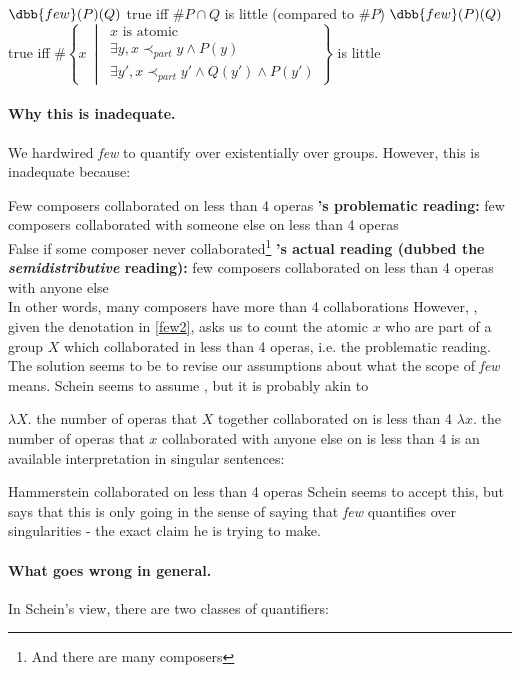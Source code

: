 \documentclass[english]{article}
\begin{document}
\pex
\a $\dbb{few}(P)(Q)$ true iff $\#P\cap Q$ is little (compared to $\#P$)
\a $\dbb{few}(P)(Q)$ true iff $\#\left\lbrace x\ \middle|\ 
\begin{array}{l}
x\text{ is atomic}\\
\exists y, x\prec_{part} y \wedge P(y)\\
\exists y', x\prec_{part} y' \wedge Q(y') \wedge P(y')
\end{array}
\right\rbrace$ is little \label{few2}
\xe
%

\paragraph{Why this is inadequate.} We hardwired \emph{few} to quantify over existentially over groups. However, this is inadequate because:

\pex
\a Few composers collaborated on less than 4 operas
\a \textbf{'s problematic reading:} few  composers collaborated with someone else on less than 4 operas\\
False if some composer never collaborated\footnote{And there are many composers}
\a \textbf{\cnextx{a}'s actual reading (dubbed the \emph{semidistributive} reading):} few composers collaborated on less than 4 operas with anyone else\\ 
In other words, many composers have more than 4 collaborations
\xe
%
However, , given the denotation in \cref{few2}, asks us to count the atomic $x$ who are part of a group $X$ which collaborated in less than 4 operas, i.e. the problematic reading. The solution seems to be to revise our assumptions about what the scope of \emph{few} means. Schein seems to assume , but it is probably akin to 

\pex
\a $\lambda X.$ the number of operas that $X$ together collaborated on is less than 4
\a $\lambda x.$ the number of operas that $x$ collaborated with anyone else on is less than 4
\xe
%
 is an available interpretation in singular sentences:

\ex
Hammerstein collaborated on less than 4 operas
\xe
%
Schein seems to accept this, but says that this is only going in the sense of saying that \emph{few} quantifies over singularities - the exact claim he is trying to make.

\paragraph{What goes wrong in general.} In Schein's view, there are two classes of quantifiers:
\end{document}
